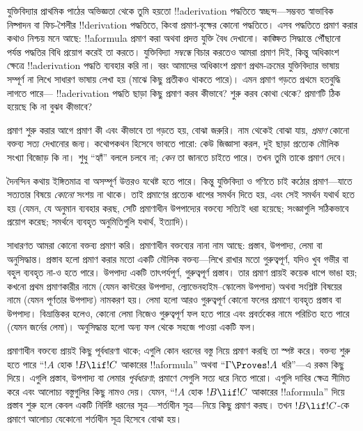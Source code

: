 \documentclass[../../../include/open-logic-section]{subfiles}
\begin{document}


যুক্তিবিদ্যার প্রাথমিক পাঠের অভিজ্ঞতা থেকে তুমি হয়তো
!!a{derivation} পদ্ধতিতে স্বচ্ছন্দ—সম্ভবত স্বাভাবিক নিষ্পাদন বা
ফিচ-শৈলীর !!{derivation} পদ্ধতিতে, কিংবা প্রমাণ-বৃক্ষের কোনো
পদ্ধতিতে। এসব পদ্ধতিতে প্রমাণ করার কথাও নিশ্চয় মনে আছে:
!!a{formula} প্রমাণ করা অথবা প্রদত্ত যুক্তি বৈধ দেখানো।
কাঙ্ক্ষিত সিদ্ধান্তে পৌঁছানো পর্যন্ত পদ্ধতির বিধি প্রয়োগ করেই
তা করতে। যুক্তিবিদ্যা \emph{সম্বন্ধে} বিচার করতেও আমরা প্রমাণ দিই,
কিন্তু অধিকাংশ ক্ষেত্রে !!a{derivation} পদ্ধতি ব্যবহার করি না।
বরং আমাদের অধিকাংশ প্রমাণ প্রথম-ক্রমের যুক্তিবিদ্যার ভাষায়
সম্পূর্ণ না লিখে সাধারণ ভাষায় লেখা হয় (মাঝে কিছু প্রতীকও
থাকতে পারে)। এমন প্রমাণ গড়তে প্রথমে হতবুদ্ধি লাগতে পারে—
!!a{derivation} পদ্ধতি ছাড়া কিছু প্রমাণ করব কীভাবে? শুরু করব
কোথা থেকে? প্রমাণটি ঠিক হয়েছে কি না বুঝব কীভাবে?

প্রমাণ শুরু করার আগে প্রমাণ কী এবং কীভাবে তা গড়তে হয়,
বোঝা জরুরি। নাম থেকেই বোঝা যায়, \emph{প্রমাণ} কোনো
বক্তব্য সত্য দেখানোর জন্য। কথোপকথন হিসেবে ভাবতে পারো:
কেউ জিজ্ঞাসা করল, দুই ছাড়া প্রত্যেক মৌলিক সংখ্যা বিজোড়
কি না। শুধু ``হ্যাঁ'' বললে চলবে না; \emph{কেন} তা জানতে
চাইতে পারে। তখন তুমি তাকে প্রমাণ দেবে।

দৈনন্দিন কথায় ইঙ্গিতমাত্র বা অসম্পূর্ণ উত্তরও যথেষ্ট হতে
পারে। কিন্তু যুক্তিবিদ্যা ও গণিতে চাই কঠোর প্রমাণ—যাতে
সত্যতার বিষয়ে \emph{কোনো} সংশয় না থাকে। তাই প্রমাণের
প্রত্যেক ধাপের সমর্থন দিতে হয়, এবং সেই সমর্থন যথার্থ হতে হয়
(যেমন, যে অনুমান ব্যবহার করছ, সেটি প্রমাণাধীন উপপাদ্যের
বক্তব্যে সত্যিই ধরা হয়েছে; সংজ্ঞাগুলি সঠিকভাবে প্রয়োগ
করেছ; সমর্থনে ব্যবহৃত অনুমিতিগুলি যথার্থ, ইত্যাদি)।

সাধারণত আমরা কোনো বক্তব্য প্রমাণ করি। প্রমাণাধীন বক্তব্যের
নানা নাম আছে: প্রস্তাব, উপপাদ্য, লেমা বা অনুসিদ্ধান্ত।
প্রস্তাব হলো প্রমাণ করার মতো একটি মৌলিক বক্তব্য—লিখে রাখার
মতো গুরুত্বপূর্ণ, যদিও খুব গভীর বা বহুল ব্যবহৃত না-ও হতে
পারে। উপপাদ্য একটি তাৎপর্যপূর্ণ, গুরুত্বপূর্ণ প্রস্তাব। তার
প্রমাণ প্রায়ই কয়েক ধাপে ভাঙা হয়; কখনো প্রথম প্রমাণকারীর
নামে (যেমন কান্টরের উপপাদ্য, ল্যোভেনহাইম--স্কোলেম উপপাদ্য)
অথবা সংশ্লিষ্ট বিষয়ের নামে (যেমন পূর্ণতার উপপাদ্য) নামকরণ
হয়। লেমা হলো আরও গুরুত্বপূর্ণ কোনো ফলের প্রমাণে ব্যবহৃত
প্রস্তাব বা উপপাদ্য। বিভ্রান্তিকর হলেও, কোনো লেমা নিজেও
গুরুত্বপূর্ণ ফল হতে পারে এবং প্রবর্তকের নামে পরিচিত হতে পারে
(যেমন জর্নের লেমা)। অনুসিদ্ধান্ত হলো অন্য ফল থেকে সহজে
পাওয়া একটি ফল।

প্রমাণাধীন বক্তব্যে প্রায়ই কিছু পূর্বধারণা থাকে; এগুলি কোন
ধরনের বস্তু নিয়ে প্রমাণ করছি তা স্পষ্ট করে। বক্তব্য শুরু হতে
পারে ``$!A$ হোক $!B \lif !C$ আকারের !!a{formula}''
অথবা ``$\Gamma \Proves !A$ ধরি''—এ রকম কিছু দিয়ে।
এগুলি প্রস্তাব, উপপাদ্য বা লেমার \emph{পূর্বধারণা};
প্রমাণে সেগুলি সত্য ধরে নিতে পারো। এগুলি দাবির ক্ষেত্র সীমিত
করে এবং আলোচ্য বস্তুগুলির কিছু নামও দেয়। যেমন,
``$!A$ হোক $!B \lif !C$ আকারের !!a{formula}''
দিয়ে প্রস্তাব শুরু হলে কেবল একটি নির্দিষ্ট ধরনের
সূত্র—শর্তাধীন সূত্র—নিয়ে কিছু প্রমাণ করছ। তখন
$!B \lif !C$-কে প্রমাণে আলোচ্য যেকোনো শর্তাধীন সূত্র
হিসেবে বোঝা হয়।
\end{document}
